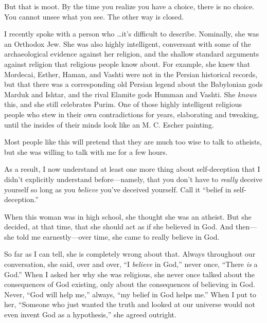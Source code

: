 {
 But that is moot. By the time you realize you have a choice, there
is no choice. You cannot unsee what you see. The other way is closed.}

\myendsectiontext


\bigskip


{
 I recently spoke with a person who \ldots it's
difficult to describe. Nominally, she was an Orthodox Jew. She was also
highly intelligent, conversant with some of the archaeological evidence
against her religion, and the shallow standard arguments against
religion that religious people know about. For example, she knew that
Mordecai, Esther, Haman, and Vashti were not in the Persian historical
records, but that there was a corresponding old Persian legend about
the Babylonian gods Marduk and Ishtar, and the rival Elamite gods
Humman and Vashti. She \textit{knows} this, and she still celebrates
Purim. One of those highly intelligent religious people who stew in
their own contradictions for years, elaborating and tweaking, until the
insides of their minds look like an M. C. Escher painting. }

{
 Most people like this will pretend that they are much too wise to
talk to atheists, but she was willing to talk with me for a few hours.}

{
 As a result, I now understand at least one more thing about
self-deception that I didn't explicitly understand
before---namely, that you don't have to \textit{really}
deceive yourself so long as you \textit{believe} you've
deceived yourself. Call it ``belief in
self-deception.''}

{
 When this woman was in high school, she thought she was an
atheist. But she decided, at that time, that she should act as if she
believed in God. And then---she told me earnestly---over time, she came
to really believe in God.}

{
 So far as I can tell, she is completely wrong about that. Always
throughout our conversation, she said, over and over,
``I \textit{believe} in God,'' never
once, ``There \textit{is} a God.''
When I asked her why she was religious, she never once talked about the
consequences of God existing, only about the consequences of believing
in God. Never, ``God will help me,''
always, ``my belief in God helps
me.'' When I put to her, ``Someone
who just wanted the truth and looked at our universe would not even
invent God as a hypothesis,'' she agreed outright.}

